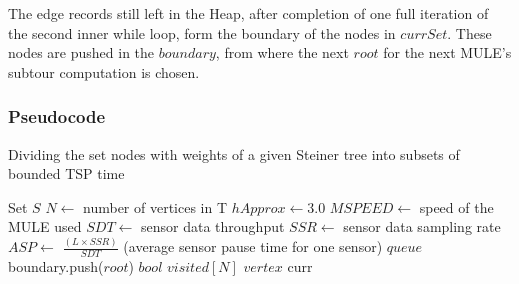 The edge records still left in the Heap, after completion of one full iteration of the second inner while loop, form the boundary of the nodes in $currSet$. These nodes are pushed in the $boundary$, from where the next $root$ for the next MULE's subtour computation is chosen.%

\subsubsection{Pseudocode}
\label{sec:heuristicAlgo}

\begin{algorithm}
\caption{Dividing the set nodes with weights of a given Steiner tree into subsets of bounded TSP time}\label{euclid}
\begin{algorithmic}
\State Set  $S$
\State $N \gets$ number of vertices in T
\State $hApprox \gets 3.0$
\State $MSPEED \gets$ speed of the MULE used
\State $SDT \gets$ sensor data throughput
\State $SSR \gets$ sensor data sampling rate
\State $ASP \gets$ $\frac{(L\times SSR)}{SDT}$ (average sensor pause time for one sensor)
\State $queue$ boundary.push($root$) 
\State $bool$ $visited[N]$
\State $vertex$ curr 

\end{algorithmic}
\end{algorithm}

